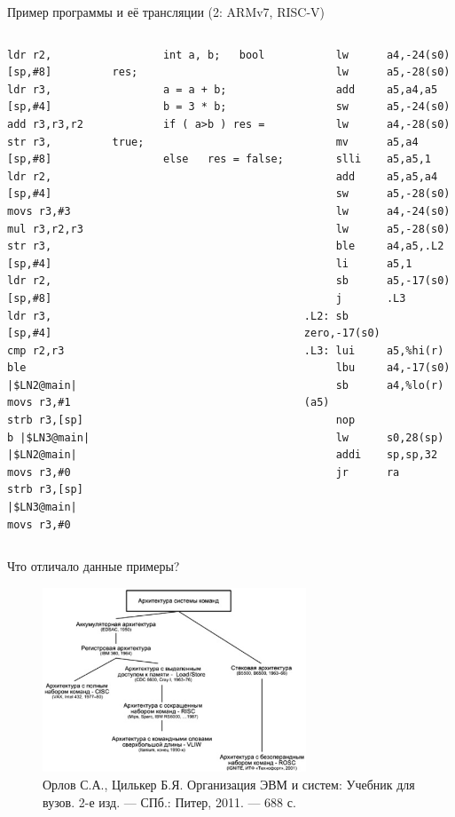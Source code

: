\documentclass[xetex,aspectratio=43]{beamer}
\begin{document}
\begin{frame}[fragile]{Пример программы и её трансляции (2: ARMv7, RISC-V)}
\footnotesize
\begin{columns}
    \begin{column}{0.15\textwidth}
\begin{verbatim}
ldr r2,[sp,#8]
ldr r3,[sp,#4]
add r3,r3,r2
str r3,[sp,#8]
ldr r2,[sp,#4]
movs r3,#3
mul r3,r2,r3
str r3,[sp,#4]
ldr r2,[sp,#8]
ldr r3,[sp,#4]
cmp r2,r3
ble |$LN2@main|
movs r3,#1
strb r3,[sp]
b |$LN3@main|
|$LN2@main|
movs r3,#0
strb r3,[sp]
|$LN3@main|
movs r3,#0
\end{verbatim}
    \end{column}
    \begin{column}{0.3\textwidth}
    \begin{verbatim}
        int a, b;   bool res;
        a = a + b;
        b = 3 * b;
        if ( a>b ) res = true;
        else   res = false;
    \end{verbatim}
\end{column}
\begin{column}{0.2\textwidth}
\scriptsize
\begin{verbatim}
     lw      a4,-24(s0)
     lw      a5,-28(s0)
     add     a5,a4,a5
     sw      a5,-24(s0)
     lw      a4,-28(s0)
     mv      a5,a4
     slli    a5,a5,1
     add     a5,a5,a4
     sw      a5,-28(s0)
     lw      a4,-24(s0)
     lw      a5,-28(s0)
     ble     a4,a5,.L2
     li      a5,1
     sb      a5,-17(s0)
     j       .L3
.L2: sb      zero,-17(s0)
.L3: lui     a5,%hi(r)
     lbu     a4,-17(s0)
     sb      a4,%lo(r)(a5)
     nop
     lw      s0,28(sp)
     addi    sp,sp,32
     jr      ra
\end{verbatim}
\end{column}
\end{columns}
\end{frame}

\begin{frame}{Что отличало данные примеры?}
    \begin{figure}
    \includegraphics[width=0.7\textwidth]{img/11.instr_sets.png}
    \caption{Орлов С.А., Цилькер Б.Я. Организация ЭВМ и систем: Учебник для вузов. 2-е изд. — СПб.: Питер, 2011. — 688 с.}
    \end{figure}
\end{frame}
\end{document}
